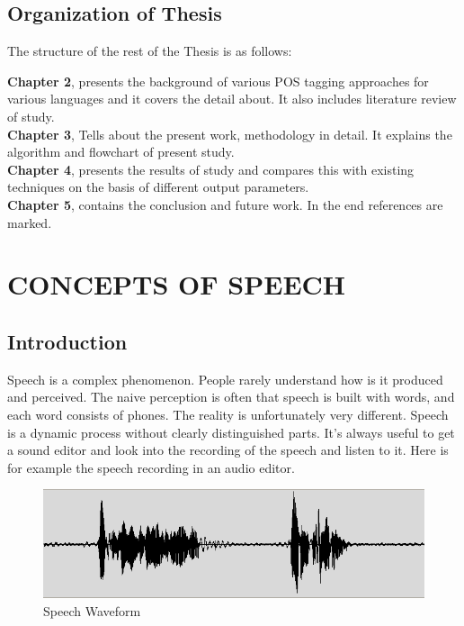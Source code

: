 \documentclass[12pt,a4paper,oneside]{memoir}
\begin{document}
\section{Organization of Thesis}
The structure of the rest of the Thesis is as follows:

\textbf{Chapter 2}, presents the background of various POS tagging approaches  for various languages and it covers the detail about. It also includes literature review of study. \\

\textbf{Chapter 3}, Tells about the present work, methodology in detail. It explains the algorithm and flowchart of present study.\\


\textbf{Chapter 4}, presents the results of study and compares this with existing techniques on the basis of different output parameters.\\

\textbf{Chapter 5}, contains the conclusion and future work. In the end references are marked.\\














\chapter{ CONCEPTS OF SPEECH}

\section{Introduction}
Speech is a complex phenomenon. People rarely understand how is it produced and perceived. The naive perception is often that speech is built with words, and each word consists of phones. The reality is unfortunately very different. Speech is a dynamic process without clearly distinguished parts. It's always useful to get a sound editor and look into the recording of the speech and listen to it. Here is for example the speech recording in an audio editor.

\begin{figure}[h]
    \centering
    \includegraphics[scale=0.5]{waveform}
    \caption{Speech Waveform}
\end{figure}
\end{document}
